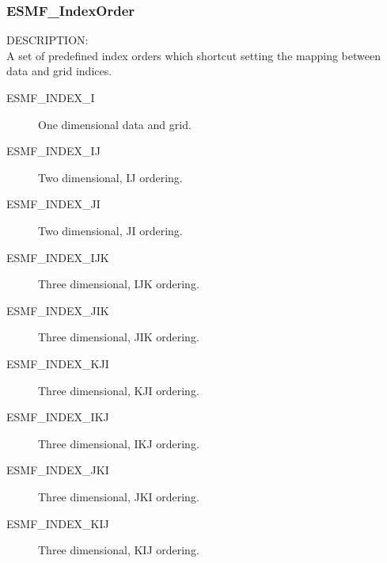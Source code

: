 \subsubsection{ESMF\_IndexOrder}

{\sf DESCRIPTION:\\}
A set of predefined index orders which shortcut setting
the mapping between data and grid indices.

\begin{description}
   \item[ESMF\_INDEX\_I]  One dimensional data and grid.
   \item[ESMF\_INDEX\_IJ] Two dimensional, IJ ordering.
   \item[ESMF\_INDEX\_JI] Two dimensional, JI ordering.
   \item[ESMF\_INDEX\_IJK] Three dimensional, IJK ordering.
   \item[ESMF\_INDEX\_JIK] Three dimensional, JIK ordering.
   \item[ESMF\_INDEX\_KJI] Three dimensional, KJI ordering.
   \item[ESMF\_INDEX\_IKJ] Three dimensional, IKJ ordering.
   \item[ESMF\_INDEX\_JKI] Three dimensional, JKI ordering.
   \item[ESMF\_INDEX\_KIJ] Three dimensional, KIJ ordering.
\end{description}

